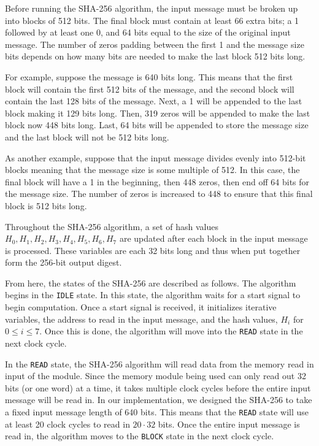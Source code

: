 \documentclass{article}
\begin{document}

Before running the SHA-256 algorithm, the input message must be broken up into blocks of 512 bits. The final block must contain at least 66 extra bits; a 1 followed by at least one 0, and 64 bits equal to the size of the original input message. The number of zeros padding between the first 1 and the message size bits depends on how many bits are needed to make the last block 512 bits long.

For example, suppose the message is 640 bits long. This means that the first block will contain the first 512 bits of the message, and the second block will contain the last 128 bits of the message. Next, a 1 will be appended to the last block making it 129 bits long. Then, 319 zeros will be appended to make the last block now 448 bits long. Last, 64 bits will be appended to store the message size and the last block will not be 512 bits long.

As another example, suppose that the input message divides evenly into 512-bit blocks meaning that the message size is some multiple of 512. In this case, the final block will have a 1 in the beginning, then 448 zeros, then end off 64 bits for the message size. The number of zeros is increased to 448 to ensure that this final block is 512 bits long.

Throughout the SHA-256 algorithm, a set of hash values $H_0, H_1, H_2, H_3, H_4, H_5, H_6, H_7$ are updated after each block in the input message is processed. These variables are each 32 bits long and thus when put together form the 256-bit output digest.

From here, the states of the SHA-256 are described as follows. The algorithm begins in the \verb|IDLE| state. In this state, the algorithm waits for a start signal to begin computation. Once a start signal is received, it initializes iterative variables, the address to read in the input message, and the hash values, $H_i$ for $0 \leq i \leq 7$. Once this is done, the algorithm will move into the \verb|READ| state in the next clock cycle.

In the \verb|READ| state, the SHA-256 algorithm will read data from the memory read in input of the module. Since the memory module being used can only read out 32 bits (or one word) at a time, it takes multiple clock cycles before the entire input message will be read in. In our implementation, we designed the SHA-256 to take a fixed input message length of 640 bits. This means that the \verb|READ| state will use at least 20 clock cycles to read in $20\cdot 32$ bits. Once the entire input message is read in, the algorithm moves to the \verb|BLOCK| state in the next clock cycle.
\end{document}
